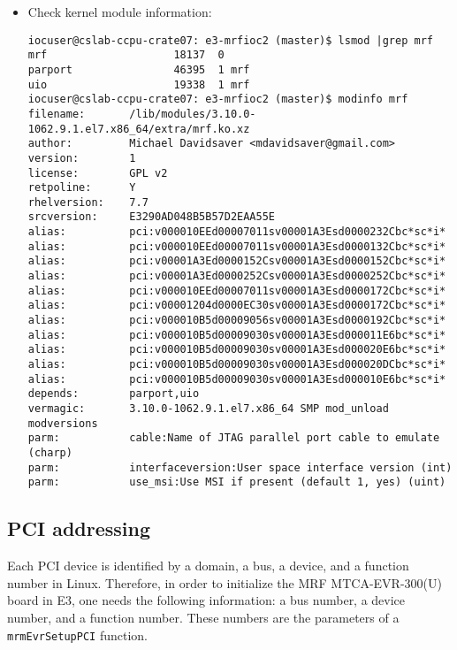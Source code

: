 \documentclass[11pt
  , a4paper
  , article
  , oneside
  , showtrims
]{memoir}
\begin{document}
{\begin{itemize}
\begin{lstlisting}[style=termstyle]
It is OK to see "E3/RULES_DKMS:37: recipe for target 'setup' failed"
---------------------------------------------------------------------
crw-rw-rw- 1 root root 245, 0 Feb 04 15:37 /dev/uio0
crw-rw-rw- 1 root root 245, 1 Feb 04 15:37 /dev/uio1
---------------------------------------------------------------------
\end{lstlisting}
\item Check kernel module information:
\begin{lstlisting}[style=termstyle]
iocuser@cslab-ccpu-crate07: e3-mrfioc2 (master)$ lsmod |grep mrf
mrf                    18137  0
parport                46395  1 mrf
uio                    19338  1 mrf
iocuser@cslab-ccpu-crate07: e3-mrfioc2 (master)$ modinfo mrf
filename:       /lib/modules/3.10.0-1062.9.1.el7.x86_64/extra/mrf.ko.xz
author:         Michael Davidsaver <mdavidsaver@gmail.com>
version:        1
license:        GPL v2
retpoline:      Y
rhelversion:    7.7
srcversion:     E3290AD048B5B57D2EAA55E
alias:          pci:v000010EEd00007011sv00001A3Esd0000232Cbc*sc*i*
alias:          pci:v000010EEd00007011sv00001A3Esd0000132Cbc*sc*i*
alias:          pci:v00001A3Ed0000152Csv00001A3Esd0000152Cbc*sc*i*
alias:          pci:v00001A3Ed0000252Csv00001A3Esd0000252Cbc*sc*i*
alias:          pci:v000010EEd00007011sv00001A3Esd0000172Cbc*sc*i*
alias:          pci:v00001204d0000EC30sv00001A3Esd0000172Cbc*sc*i*
alias:          pci:v000010B5d00009056sv00001A3Esd0000192Cbc*sc*i*
alias:          pci:v000010B5d00009030sv00001A3Esd000011E6bc*sc*i*
alias:          pci:v000010B5d00009030sv00001A3Esd000020E6bc*sc*i*
alias:          pci:v000010B5d00009030sv00001A3Esd000020DCbc*sc*i*
alias:          pci:v000010B5d00009030sv00001A3Esd000010E6bc*sc*i*
depends:        parport,uio
vermagic:       3.10.0-1062.9.1.el7.x86_64 SMP mod_unload modversions
parm:           cable:Name of JTAG parallel port cable to emulate (charp)
parm:           interfaceversion:User space interface version (int)
parm:           use_msi:Use MSI if present (default 1, yes) (uint)

\end{lstlisting}
\end{itemize}

\subsection{PCI addressing}
Each PCI device is identified by a domain, a bus, a device, and a function number in Linux. Therefore, in order to initialize the MRF MTCA-EVR-300(U) board in E3, one needs the following information: a bus number, a device number, and a function number. These numbers are the parameters of a \texttt{mrmEvrSetupPCI} function.\\

}
\end{document}
